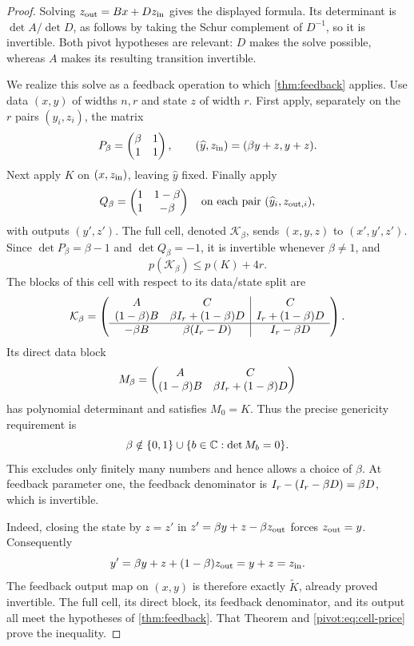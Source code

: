 \begin{proof}
Solving $z_{\rm out}=Bx+Dz_{\rm in}$ gives the displayed formula.
Its determinant is $\det A/\det D$, as follows by taking the Schur
complement of $D^{-1}$, so it is invertible. Both pivot hypotheses
are relevant: $D$ makes the solve possible, whereas $A$ makes its
resulting transition invertible.

We realize this solve as a feedback operation to which
\cref{thm:feedback} applies. Use data $(x,y)$ of widths $n,r$ and
state $z$ of width $r$. First apply, separately on the $r$ pairs
$(y_i,z_i)$, the matrix
\[
 P_\beta=\begin{pmatrix}\beta&1\\1&1\end{pmatrix},
 \qquad (\widehat y,z_{\rm in})=(\beta y+z,y+z).
\]
Next apply $K$ on $(x,z_{\rm in})$, leaving $\widehat y$ fixed.
Finally apply
\[
 Q_\beta=\begin{pmatrix}1&1-\beta\\1&-\beta\end{pmatrix}
 \quad\hbox{on each pair }(\widehat y_i,z_{{\rm out},i}),
\]
with outputs $(y',z')$. The full cell, denoted $\mathcal K_\beta$,
sends $(x,y,z)$ to $(x',y',z')$. Since
$\det P_\beta=\beta-1$ and $\det Q_\beta=-1$, it is invertible
whenever $\beta\ne1$, and
\begin{equation}\label{pivot:eq:cell-price}
 p(\mathcal K_\beta)\le p(K)+4r.
\end{equation}
The blocks of this cell with respect to its data/state split are
\begin{equation}\label{pivot:eq:beta-cell}
 \mathcal K_\beta=
 \left(
 \begin{array}{cc|c}
 A&C&C\\
 (1-\beta)B&\beta I_r+(1-\beta)D&I_r+(1-\beta)D\\ \hline
 -\beta B&\beta(I_r-D)&I_r-\beta D
 \end{array}
 \right).
\end{equation}
Its direct data block
\[
 M_\beta=
 \begin{pmatrix}A&C\\(1-\beta)B&\beta I_r+(1-\beta)D\end{pmatrix}
\]
has polynomial determinant and satisfies $M_0=K$. Thus the precise
genericity requirement is
\begin{equation}\label{pivot:eq:beta-exceptions}
 \beta\notin\{0,1\}\cup
 \{b\in\mathbb C:\det M_b=0\}.
\end{equation}
This excludes only finitely many numbers and hence allows a choice of
$\beta$. At feedback parameter one, the feedback denominator is
$I_r-(I_r-\beta D)=\beta D$, which is invertible.

Indeed, closing the state by $z=z'$ in
$z'=\beta y+z-\beta z_{\rm out}$ forces
$z_{\rm out}=y$. Consequently
\[
 y'=\beta y+z+(1-\beta)z_{\rm out}=y+z=z_{\rm in}.
\]
The feedback output map on $(x,y)$ is therefore exactly
$\widetilde K$, already proved invertible. The full cell, its direct
block, its feedback denominator, and its output all meet the hypotheses
of \cref{thm:feedback}. That Theorem and
\cref{pivot:eq:cell-price} prove the inequality.
\end{proof}

